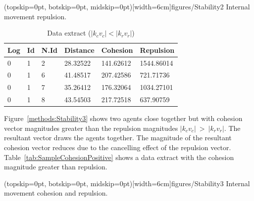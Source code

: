 \documentclass{ieeeaccess}
\begin{document}
\Figure[t!](topskip=0pt, botskip=0pt, midskip=0pt)[width=6cm]{figures/Stability2}
{Internal movement repulsion.\label{methods:Stability2}}


\begin{table}[H]
\begin{center}
\begin{tabular}{| l | l | l | l | l | l |}
\hline
Log &	Id &	N.Id &	Distance &	{\color{green}Cohesion} &	{\color{red}Repulsion} 	\\ \hline
0 & 1 & 2 & 28.32522 & {\color{green}141.62612} & {\color{red}1544.86014} \\ \hline
0 & 1 & 6 & 41.48517 & {\color{green}207.42586} & {\color{red}721.71736} \\ \hline
0 & 1 & 7 & 35.26412 & {\color{green}176.32064} & {\color{red}1034.27101} \\ \hline
0 & 1 & 8 & 43.54503 & {\color{green}217.72518} & {\color{red}637.90759} \\
\hline
\end{tabular}\caption{Data extract ($|k_cv_c| < |k_rv_r|$)} \label{tab:SampleReplusionPositive}
\end{center}
\end{table}

Figure~\ref{methods:Stability3} shows two agents close together but with cohesion vector magnitudes greater than the repulsion magnitudes $|k_cv_c|~>~|k_rv_r|$. The resultant vector draws the agents together. The magnitude of the resultant cohesion vector reduces due to the cancelling effect of the repulsion vector. Table~\ref{tab:SampleCohesionPositive} shows a data extract with the cohesion magnitude greater than repulsion.

\Figure[t!](topskip=0pt, botskip=0pt, midskip=0pt)[width=6cm]{figures/Stability3}
{Internal movement cohesion and repulsion.\label{methods:Stability3}}

\end{document}
